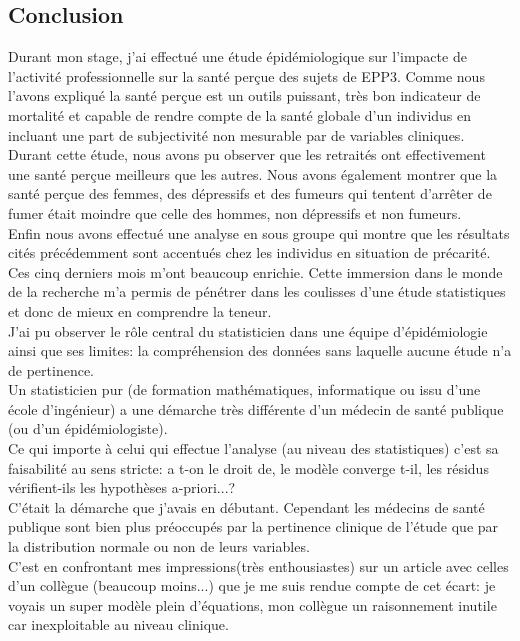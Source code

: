 \documentclass{book}
\begin{document}
\begin{center}
\section*{Conclusion}
\noindent
Durant mon stage, j'ai effectué une étude épidémiologique sur l'impacte de l'activité professionnelle sur la santé perçue des sujets de EPP3. Comme nous l'avons expliqué la santé perçue est un outils puissant, très bon indicateur de mortalité et capable de rendre compte de la santé globale d'un individus en incluant une part de subjectivité non mesurable par de variables cliniques.\\

\bigskip
\noindent
Durant cette étude, nous avons pu observer que les retraités ont effectivement une santé perçue meilleurs que les autres. Nous avons également montrer que la santé perçue des femmes, des dépressifs et des fumeurs qui tentent d'arrêter de fumer était moindre que celle des hommes, non dépressifs et non fumeurs.\\

\bigskip
\noindent
Enfin nous avons effectué une analyse en sous groupe qui montre que les résultats cités précédemment sont accentués chez les individus en situation de précarité.\\

\bigskip
\noindent
Ces cinq derniers mois m'ont beaucoup enrichie. Cette immersion dans le monde de la recherche m'a permis de pénétrer dans les coulisses d'une étude statistiques et donc de mieux en comprendre la teneur.\\
J'ai pu observer le rôle central du statisticien dans une équipe d'épidémiologie ainsi que ses limites: la compréhension des données sans laquelle aucune étude n'a de pertinence.\\

\bigskip
\noindent
Un statisticien pur (de formation mathématiques, informatique ou issu d'une école d'ingénieur) a une démarche très différente d'un médecin de santé publique (ou d'un épidémiologiste).\\
Ce qui importe à celui qui effectue l'analyse (au niveau des statistiques) c'est sa faisabilité au sens stricte: a t-on le droit de, le modèle converge t-il, les résidus vérifient-ils les hypothèses a-priori...? \\
C'était la démarche que j'avais en débutant. Cependant les médecins de santé publique sont bien plus préoccupés par la pertinence clinique de l'étude que par la distribution normale ou non de leurs variables.\\
C'est en confrontant mes impressions(très enthousiastes) sur un article avec celles d'un collègue (beaucoup moins...) que je me suis rendue compte de cet écart: je voyais un super modèle plein d'équations, mon collègue un raisonnement inutile car inexploitable au niveau clinique.\\


\end{center}
\end{document}
